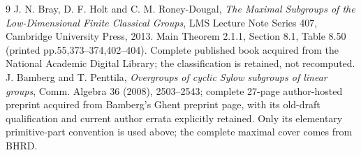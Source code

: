 \documentclass[11pt]{article}
\begin{document}
\begin{thebibliography}{9}
 J. N. Bray, D. F. Holt and C. M. Roney-Dougal,
\emph{The Maximal Subgroups of the Low-Dimensional Finite Classical Groups},
LMS Lecture Note Series 407, Cambridge University Press, 2013.
Main Theorem 2.1.1, Section 8.1, Table 8.50 (printed pp.55,373--374,402--404).
Complete published book acquired from the National Academic Digital Library;
the classification is retained, not recomputed.
 J. Bamberg and T. Penttila,
\emph{Overgroups of cyclic Sylow subgroups of linear groups},
Comm. Algebra 36 (2008), 2503--2543; complete 27-page author-hosted preprint
acquired from Bamberg's Ghent preprint page, with its old-draft qualification
and current author errata explicitly retained. Only its elementary
primitive-part convention is used above; the complete maximal cover comes
from BHRD.
\end{thebibliography}
\end{document}
